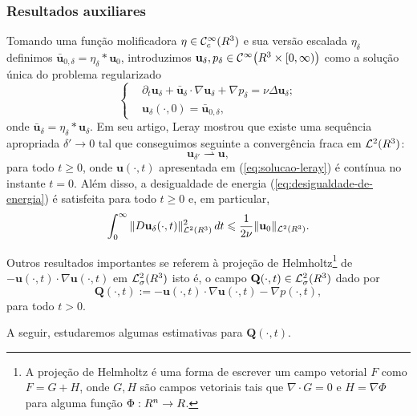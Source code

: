 \documentclass[xcolor=dvipsnames, aspectratio=169, 10pt]{beamer}
\let\mathbb\relax
\newcommand{\bR}{\mathbb{R}}
\newcommand{\bu}{\mathbf{u}}
\newcommand{\BQ}{\mathbf{Q}}
\newcommand{\cC}{\mathcal{C}}
\newcommand{\cL}{\mathcal{L}}
\begin{document}
\begin{frame}
    \frametitle{Resultados auxiliares}
    Tomando uma função molificadora $\eta \in \cC^{\infty}_c(\bR^3)$ e sua versão escalada $\eta_\delta$ definimos $\bar{\bu}_{0,\delta} = \eta_\delta * \bu_0$, introduzimos $\bu_\delta, p_\delta \in \cC^{\infty}\big( \bR^3 \times [0,\infty) \big)$ como a solução única do problema regularizado
\begin{equation} \label{eq:navier-stokes-regularizado}
    \left\{
        \begin{aligned}
        &\partial_t \bu_\delta + \bar{\bu}_\delta \cdot \nabla \bu_\delta  + \nabla p_\delta= \nu \Delta \bu_\delta;\\
        &\bu_\delta(\cdot,0) = \bar{\bu}_{0,\delta},
        \end{aligned}
    \right.
\end{equation}
onde $\bar{\bu}_\delta = \eta_\delta * \bu_\delta$. Em seu artigo, Leray mostrou que existe uma sequência apropriada $\delta' \to 0$ tal que conseguimos seguinte a convergência fraca em $\cL^2(\bR^3)$:
\begin{equation} \label{eq:b1}
    \bu_{\delta'} \rightharpoonup \bu,
\end{equation}
para todo $t \geqslant 0$, onde $\bu(\cdot,t)$ apresentada em (\ref{eq:solucao-leray}) é contínua no instante $t = 0$.
Além disso, a desigualdade de energia (\ref{eq:desigualdade-de-energia}) é satisfeita para todo $t \geqslant 0$ e, em particular,
\begin{equation} \label{eq:2.3}
    \int_0^{\infty} \Vert D\bu_\delta(\cdot,t) \Vert_{\cL^2(\bR^3)}^2 \,dt \leqslant \frac{1}{2\nu} \Vert \bu_{0} \Vert_{\cL^2(\bR^3)}.
\end{equation}
\end{frame}
\begin{frame}
    Outros resultados importantes se referem à projeção de Helmholtz\footnote{A projeção de Helmholtz é uma forma de escrever um campo vetorial $F$ como $F = G + H$, onde $G, H$ são campos vetoriais tais que $\nabla \cdot G = 0$ e $H = \nabla \Phi$ para alguma função $\Phi : \bR^n \to \bR$.} de $-\bu(\cdot,t) \cdot \nabla \bu(\cdot,t)$ em $\cL^2_\sigma(\bR^3)$ isto é, o campo $\BQ(\cdot,t) \in \cL^2_\sigma(\bR^3)$ dado por
\begin{equation} \label{eq:defQ}
    \BQ(\cdot,t) := -\bu(\cdot,t) \cdot \nabla \bu(\cdot,t) - \nabla p(\cdot,t),
\end{equation}
para todo $t > 0$.

A seguir, estudaremos algumas estimativas para $\BQ(\cdot,t)$.
\end{frame}
\end{document}
